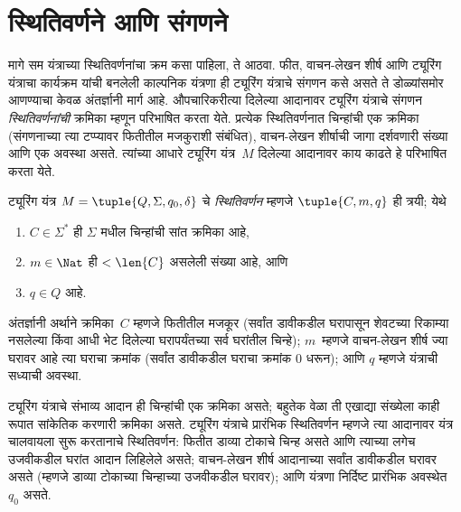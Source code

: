 \section{स्थितिवर्णने आणि संगणने}\label{cmp:tur:con:sec}

\begin{explain}
मागे सम यंत्राच्या स्थितिवर्णनांचा क्रम कसा पाहिला, ते आठवा.
फीत, वाचन-लेखन शीर्ष आणि ट्यूरिंग यंत्राचा कार्यक्रम यांची बनलेली
काल्पनिक यंत्रणा ही ट्यूरिंग यंत्राचे संगणन कसे असते ते डोळ्यांसमोर
आणण्याचा केवळ अंतर्ज्ञानी मार्ग आहे. औपचारिकरीत्या दिलेल्या आदानावर
ट्यूरिंग यंत्राचे संगणन \emph{स्थितिवर्णनांची} क्रमिका म्हणून
परिभाषित करता येते. प्रत्येक स्थितिवर्णनात चिन्हांची एक क्रमिका
(संगणनाच्या त्या टप्प्यावर फितीतील मजकुराशी संबंधित), वाचन-लेखन
शीर्षाची जागा दर्शवणारी संख्या आणि एक अवस्था असते. त्यांच्या
आधारे ट्यूरिंग यंत्र~$M$ दिलेल्या आदानावर काय काढते हे परिभाषित
करता येते.
\end{explain}

\begin{defn}[स्थितिवर्णन]
ट्यूरिंग यंत्र $M = \tuple{Q, \Sigma, q_0,
\delta}$ चे \emph{स्थितिवर्णन} म्हणजे $\tuple{C, m, q}$ ही त्रयी;
येथे
\begin{enumerate}
\item $C \in \Sigma^*$ ही $\Sigma$ मधील चिन्हांची सांत क्रमिका आहे,
\item $m \in \Nat$ ही $< \len{C}$ असलेली संख्या आहे, आणि
\item $q \in Q$ आहे.
\end{enumerate}
अंतर्ज्ञानी अर्थाने क्रमिका~$C$ म्हणजे फितीतील मजकूर (सर्वांत
डावीकडील घरापासून शेवटच्या रिकाम्या नसलेल्या किंवा आधी भेट दिलेल्या
घरापर्यंतच्या सर्व घरांतील चिन्हे); $m$~म्हणजे वाचन-लेखन शीर्ष ज्या
घरावर आहे त्या घराचा क्रमांक (सर्वांत डावीकडील घराचा क्रमांक $0$
धरून); आणि $q$ म्हणजे यंत्राची सध्याची अवस्था.
\end{defn}

\begin{explain}
ट्यूरिंग यंत्राचे संभाव्य आदान ही चिन्हांची एक क्रमिका असते; बहुतेक
वेळा ती एखाद्या संख्येला काही रूपात सांकेतिक करणारी क्रमिका असते.
ट्यूरिंग यंत्राचे प्रारंभिक स्थितिवर्णन म्हणजे त्या आदानावर यंत्र
चालवायला सुरू करतानाचे स्थितिवर्णन: फितीत डाव्या टोकाचे चिन्ह असते
आणि त्याच्या लगेच उजवीकडील घरांत आदान लिहिलेले असते; वाचन-लेखन
शीर्ष आदानाच्या सर्वांत डावीकडील घरावर असते (म्हणजे डाव्या टोकाच्या
चिन्हाच्या उजवीकडील घरावर); आणि यंत्रणा निर्दिष्ट प्रारंभिक
अवस्थेत~$q_0$ असते.

\end{explain}

